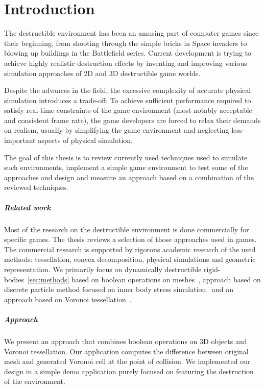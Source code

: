 \chapter*{Introduction}
The destructible environment has been an amusing part of computer games since their beginning, from shooting through the simple bricks in Space invaders to blowing up buildings in the Battlefield series. Current development is trying to achieve highly realistic destruction effects by inventing and improving various simulation approaches of 2D and 3D destructible game worlds.

Despite the advances in the field, the excessive complexity of accurate physical simulation introduces a trade-off: To achieve sufficient performance required to satisfy real-time constraints of the game environment (most notably acceptable and consistent frame rate), the game developers are forced to relax their demands on realism, usually by simplifying the game environment and neglecting less-important aspects of physical simulation.

The goal of this thesis is to review currently used techniques used to simulate such environments, implement a simple game environment to test some of the approaches and design and measure an approach based on a combination of the reviewed techniques.


\paragraph{Related work}
Most of the research on the destructible environment is done commercially for specific games. The thesis reviews a selection of those approaches used in games. The commercial research is supported by rigorous academic research of the used methods: tessellation, convex decomposition, physical simulations and geometric representation. We primarily focus on dynamically destructible rigid-bodies~\ref{sec:methods} based on boolean operations on meshes~\cite{geomod}, approach based on discrete particle method focused on inner body stress simulation~\cite{edem} and an approach based on Voronoi tessellation~\cite{nvidia}. 

\paragraph{Approach}
We present an approach that combines boolean operations on 3D objects and Voronoi tessellation. Our application computes the difference between original mesh and generated Voronoi cell at the point of collision. We implemented our design in a simple demo application purely focused on featuring the destruction of the environment.

